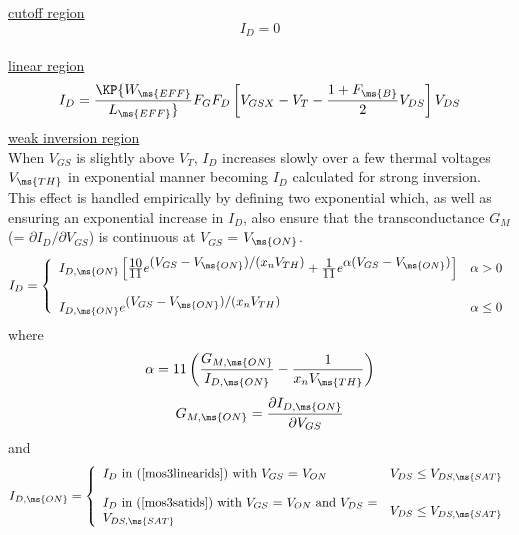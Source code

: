 \underline{cutoff region}
\begin{equation}
I_{D} = 0
\end{equation}\\[0.2in]
%
%
\underline{linear region}
\begin{equation}
 I_{D} =  \KP {{W_{\ms{EFF}}}\over{ L_{\ms{EFF}}}} F_G F_D
           \left[ V_{GSX} - V_T - {{1 + F_{\ms{B}}} \over 2} V_{DS}
       \right] V_{DS}
      \label{mos3linearids}
\end{equation}
%
%
\underline{weak inversion region}\\[0.1in]
When $V_{GS}$ is slightly above $V_T$, $I_{D}$ increases slowly
over a few thermal voltages $V_{\ms{TH}}$ in exponential manner
becoming $I_{D}$ calculated for strong inversion. This effect is
handled empirically by defining two exponential which, as well as
ensuring an exponential increase in $I_{D}$, also ensure that the
transconductance $G_M$ (= $\partial I_{D}/\partial V_{GS}$) is
continuous at $V_{GS}$ = $V_{\ms{ON}}$.
\begin{equation}
I_{D} = \left\{ \begin{array}{ll}
         I_{D,\ms{ON}}
         \left[ {{\textstyle 10}\over{\textstyle 11}}
         e^{\textstyle (V_{GS}-V_{\ms{ON}})/(x_nV_{TH})}
       + {{\textstyle 1}\over{\textstyle 11}}
         e^{\textstyle \alpha (V_{GS}-V_{\ms{ON}})} \right]  &  \alpha > 0 \\
         \\
         I_{D,\ms{ON}}
         e^{\textstyle (V_{GS}-V_{\ms{ON}})/(x_nV_{TH})}
         &  \alpha \le 0
         \end{array} \right. %
\end{equation}
where
\begin{equation}
\alpha = 11 \left( {{\textstyle G_{M,\ms{ON}}}
         \over {\textstyle I_{D,\ms{ON}}}}
         - {{\textstyle 1} \over {\textstyle
         x_n V_{\ms{TH}}}}
         \right)
\end{equation}
\begin{equation}
G_{M,\ms{ON}} = {{\partial I_{D,\ms{ON}}} \over {\partial V_{GS}}}
\end{equation}
and
\begin{equation}
I_{D,\ms{ON}} =  \left\{ \begin{array}{ll}
                  \parbox{3in}{$I_{D}$ in (\ref{mos3linearids})
                               with $V_{GS}$ = $V_{ON}$}
                  & V_{DS} \le V_{DS,\ms{SAT}} \\ \\
                  \parbox{3in}{$I_{D}$ in (\ref{mos3satids})
                               with $V_{GS}$ = $V_{ON}$ and
                               $V_{DS}$ = $V_{DS,\ms{SAT}}$}
                  & V_{DS} \le V_{DS,\ms{SAT}}
                  \end{array} \right. %
\end{equation}
